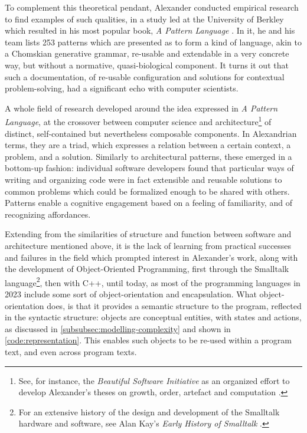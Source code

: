 To complement this theoretical pendant, Alexander conducted empirical research to find examples of such qualities, in a study led at the University of Berkley which resulted in his most popular book, \emph{A Pattern Language} \citep{alexander_pattern_1977}. In it, he and his team lists 253 patterns which are presented as to form a kind of language, akin to a Chomskian generative grammar, re-usable and extendable in a very concrete way, but without a normative, quasi-biological component. It turns it out that such a documentation, of re-usable configuration and solutions for contextual problem-solving, had a significant echo with computer scientists.

A whole field of research developed around the idea expressed in \emph{A Pattern Language}, at the crossover between computer science and architecture\footnote{See, for instance, the \emph{Beautiful Software Initiative} as an organized effort to develop Alexander's theses on growth, order, artefact and computation \citep{bryant_beautiful_2022}.} of distinct, self-contained but nevertheless composable components. In Alexandrian terms, they are a triad, which expresses a relation between a certain context, a problem, and a solution. Similarly to architectural patterns, these emerged in a bottom-up fashion: individual software developers found that particular ways of writing and organizing code were in fact extensible and reusable solutions to common problems which could be formalized enough to be shared with others. Patterns enable a cognitive engagement based on a feeling of familiarity, and of recognizing affordances.

Extending from the similarities of structure and function between software and architecture mentioned above, it is the lack of learning from practical successes and failures in the field which prompted interest in Alexander's work, along with the development of Object-Oriented Programming, first through the Smalltalk language\footnote{For an extensive history of the design and development of the Smalltalk hardware and software, see Alan Kay's \emph{Early History of Smalltalk} \citep{kay_early_1993}.}, then with C++, until today, as most of the programming languages in 2023 include some sort of object-orientation and encapsulation. What object-orientation does, is that it provides a semantic structure to the program, reflected in the syntactic structure: objects are conceptual entities, with states and actions, as discussed in \autoref{subsubsec:modelling-complexity} and shown in \autoref{code:representation}. This enables such objects to be re-used within a program text, and even across program texts.

